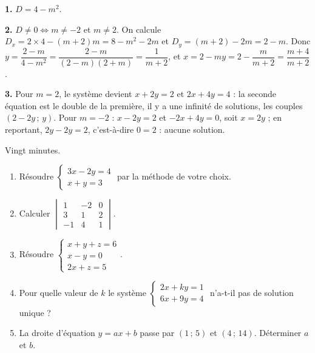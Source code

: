 \begin{corrige}
\textbf{1.} $D = 4-m^{2}$.

\textbf{2.} $D \neq 0 \iff m \neq -2$ et $m \neq 2$. On calcule
$D_{x} = 2\times4-(m+2)m = 8-m^{2}-2m$ et
$D_{y} = (m+2)-2m = 2-m$. Donc
$y = \dfrac{2-m}{4-m^{2}} = \dfrac{2-m}{(2-m)(2+m)} = \dfrac{1}{m+2}$, et
$x = 2-my = 2-\dfrac{m}{m+2} = \dfrac{m+4}{m+2}$.

\textbf{3.} Pour $m = 2$, le système devient $x+2y = 2$ et $2x+4y = 4$ : la
seconde équation est le double de la première, il y a une infinité de
solutions, les couples $\left(2-2y\,;\,y\right)$.
Pour $m = -2$ : $x-2y = 2$ et $-2x+4y = 0$, soit $x = 2y$ ; en reportant,
$2y-2y = 2$, c'est-à-dire $0 = 2$ : aucune solution.
\end{corrige}

\begin{jemeteste}
Vingt minutes.

\begin{enumerate}[label=\textbf{\arabic*.}, leftmargin=*, itemsep=0.3em]
  \item Résoudre $\begin{cases} 3x-2y = 4\\ x+y = 3\end{cases}$ par la
        méthode de votre choix.
  \item Calculer $\begin{vmatrix} 1 & -2 & 0\\ 3 & 1 & 2\\ -1 & 4 & 1
        \end{vmatrix}$.
  \item Résoudre $\begin{cases} x+y+z = 6\\ x-y = 0\\ 2x+z = 5\end{cases}$.
  \item Pour quelle valeur de $k$ le système
        $\begin{cases} 2x+ky = 1\\ 6x+9y = 4\end{cases}$
        n'a-t-il pas de solution unique ?
  \item La droite d'équation $y = ax+b$ passe par $(1\,;\,5)$ et
        $(4\,;\,14)$. Déterminer $a$ et $b$.
\end{enumerate}
\end{jemeteste}

